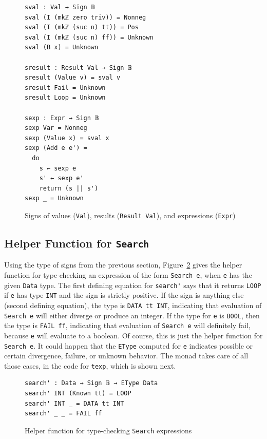 \documentclass[acmsmall,screen,review]{acmart}
\begin{document}
\begin{figure}
\begin{verbatim}
sval : Val → Sign 𝔹
sval (I (mkℤ zero triv)) = Nonneg
sval (I (mkℤ (suc n) tt)) = Pos
sval (I (mkℤ (suc n) ff)) = Unknown
sval (B x) = Unknown

sresult : Result Val → Sign 𝔹
sresult (Value v) = sval v
sresult Fail = Unknown
sresult Loop = Unknown

sexp : Expr → Sign 𝔹
sexp Var = Nonneg
sexp (Value x) = sval x
sexp (Add e e') =
  do
    s ← sexp e
    s' ← sexp e'
    return (s || s')
sexp _ = Unknown
\end{verbatim}
\caption{Signs of values (\texttt{Val}), results (\texttt{Result Val}), and expressions (\texttt{Expr})}
\label{fig:sexp}
\end{figure}

\subsection{Helper Function for \texttt{Search}}

Using the type of signs from the previous section, Figure~\ref{fig:searchp}
gives the helper function for type-checking an expression of the form \verb|Search e|,
when \verb|e| has the given \verb|Data| type.  The first defining equation for \verb|search'|
says that it returns \verb|LOOP| if \verb|e| has type \verb|INT| and the sign is strictly
positive.  If the sign is anything else (second defining equation), the type is \verb|DATA tt INT|,
indicating that evaluation of \verb|Search e| will either diverge or produce an integer.  If
the type for \verb|e| is \verb|BOOL|, then the type is \verb|FAIL ff|, indicating that evaluation
of \verb|Search e| will definitely fail, because \verb|e| will evaluate to a boolean.  Of course,
this is just the helper function for \verb|Search e|.  It could happen that the \verb|EType| computed for \verb|e|
indicates possible or certain divergence, failure, or unknown behavior.  The monad takes care of all
those cases, in the code for \verb|texp|, which is shown next.

\begin{figure}
\begin{verbatim}
search' : Data → Sign 𝔹 → EType Data
search' INT (Known tt) = LOOP
search' INT _ = DATA tt INT
search' _ _ = FAIL ff
\end{verbatim}
\caption{Helper function for type-checking \texttt{Search} expressions}
\label{fig:searchp}
\end{figure}
\end{document}
